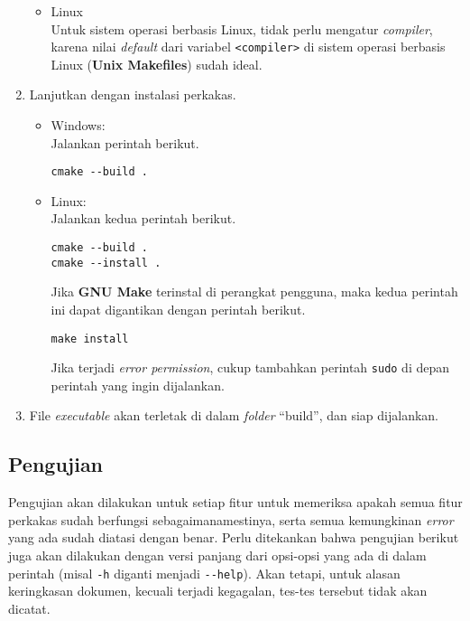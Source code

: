 \begin{enumerate}
\begin{itemize}
		\item Linux \\
		Untuk sistem operasi berbasis Linux, tidak perlu mengatur \textit{compiler}, karena nilai \textit{default} dari variabel \verb|<compiler>| di sistem operasi berbasis Linux (\textbf{Unix Makefiles}) sudah ideal.
	\end{itemize}
	
	\item Lanjutkan dengan instalasi perkakas.
	
	\begin{itemize}
		\item Windows: \\
			Jalankan perintah berikut.
			\begin{verbatim}
cmake --build .
			\end{verbatim}
		\item Linux: \\
		Jalankan kedua perintah berikut.
			\begin{verbatim}
cmake --build .
cmake --install .
			\end{verbatim}
		Jika \textbf{GNU Make} terinstal di perangkat pengguna, maka kedua perintah ini dapat digantikan dengan perintah berikut.
		\begin{verbatim}
make install
		\end{verbatim}
		Jika terjadi \textit{error permission}, cukup tambahkan perintah \verb|sudo| di depan perintah yang ingin dijalankan.
	\end{itemize}
	
	\item File \textit{executable} akan terletak di dalam \textit{folder} ``build'', dan siap dijalankan.
\end{enumerate}

\subsection{Pengujian}
\label{sec:testing-experiments-testing}

Pengujian akan dilakukan untuk setiap fitur untuk memeriksa apakah semua fitur perkakas sudah berfungsi sebagaimanamestinya, serta semua kemungkinan \textit{error} yang ada sudah diatasi dengan benar. Perlu ditekankan bahwa pengujian berikut juga akan dilakukan dengan versi panjang dari opsi-opsi yang ada di dalam perintah (misal \verb|-h| diganti menjadi \verb|--help|). Akan tetapi, untuk alasan keringkasan dokumen, kecuali terjadi kegagalan, tes-tes tersebut tidak akan dicatat.

